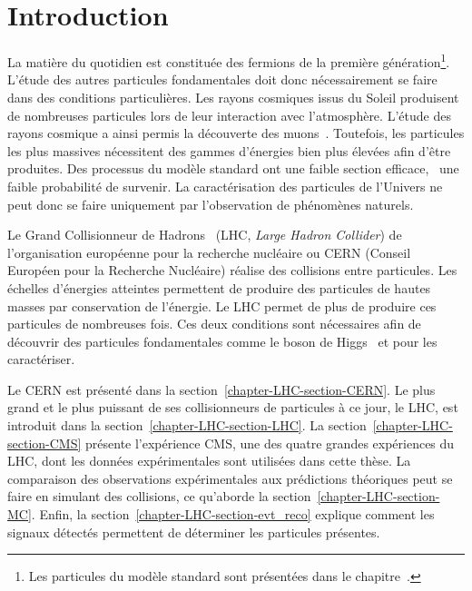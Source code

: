 \section{Introduction}\label{chapter-LHC-section-introduction}
La matière \og du quotidien \fg{} est constituée des fermions de la première génération\footnote{Les particules du modèle standard sont présentées dans le chapitre~.}.
L'étude des autres particules fondamentales doit donc nécessairement se faire dans des conditions particulières.
Les rayons cosmiques issus du Soleil produisent de nombreuses particules lors de leur interaction avec l'atmosphère.
L'étude des rayons cosmique a ainsi permis la découverte des muons~\cite{muon_discovery}.
Toutefois, les particules les plus massives nécessitent des gammes d'énergies bien plus élevées afin d'être produites.
Des processus du modèle standard ont une faible section efficace, \ie\ une faible probabilité de survenir.
La caractérisation des particules de l'Univers ne peut donc se faire uniquement par l'observation de phénomènes naturels.
\par Le Grand Collisionneur de Hadrons~\cite{LHC_paper1,LHC_paper2,LHC_paper3} (LHC, \emph{Large Hadron Collider}) de l'organisation européenne pour la recherche nucléaire ou CERN (Conseil Européen pour la Recherche Nucléaire) réalise des collisions entre particules.
Les échelles d'énergies atteintes permettent de produire des particules de hautes masses par conservation de l'énergie.
Le LHC permet de plus de produire ces particules de nombreuses fois.
Ces deux conditions sont nécessaires afin de découvrir des particules fondamentales comme le boson de Higgs~\cite{ATLAS_Higgs_discovery,CMS_Higgs_discovery,CMS_Higgs_discovery_2013,ATLAS-CMS-Higgs_combined_1,ATLAS-CMS-Higgs_combined_2} et pour les caractériser.
\par Le CERN est présenté dans la section~\ref{chapter-LHC-section-CERN}.
Le plus grand et le plus puissant de ses collisionneurs de particules à ce jour, le LHC, est introduit dans la section~\ref{chapter-LHC-section-LHC}.
La section~\ref{chapter-LHC-section-CMS} présente l'expérience CMS, une des quatre grandes expériences du LHC, dont les données expérimentales sont utilisées dans cette thèse.
La comparaison des observations expérimentales aux prédictions théoriques peut se faire en simulant des collisions, ce qu'aborde la section~\ref{chapter-LHC-section-MC}.
Enfin, la section~\ref{chapter-LHC-section-evt_reco} explique comment les signaux détectés permettent de déterminer les particules présentes.